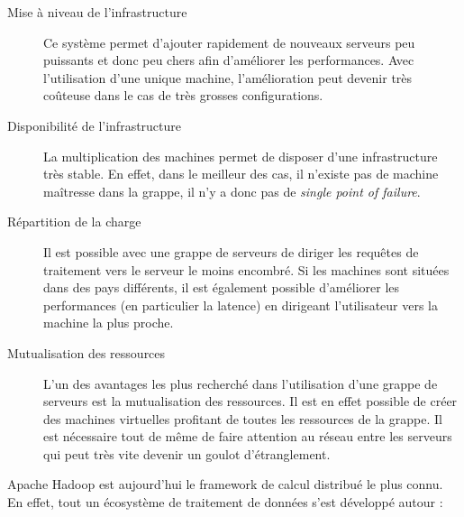     \begin{description}
      \item[Mise à niveau de l'infrastructure] Ce système permet d'ajouter rapidement de nouveaux serveurs peu puissants et donc peu chers afin d'améliorer les performances. Avec l'utilisation d'une unique machine, l'amélioration peut devenir très coûteuse dans le cas de très grosses configurations.
      \item[Disponibilité de l'infrastructure] La multiplication des machines permet de disposer d'une infrastructure très stable. En effet, dans le meilleur des cas, il n'existe pas de machine maîtresse dans la grappe, il n'y a donc pas de \textit{single point of failure}.
      \item[Répartition de la charge] Il est possible avec une grappe de serveurs de diriger les requêtes de traitement vers le serveur le moins encombré. Si les machines sont situées dans des pays différents, il est également possible d'améliorer les performances (en particulier la latence) en dirigeant l'utilisateur vers la machine la plus proche.
      \item[Mutualisation des ressources] L'un des avantages les plus recherché dans l'utilisation d'une grappe de serveurs est la mutualisation des ressources. Il est en effet possible de créer des machines virtuelles profitant de toutes les ressources de la grappe. Il est nécessaire tout de même de faire attention au réseau entre les serveurs qui peut très vite devenir un goulot d'étranglement.
    \end{description} \bigskip

    Apache Hadoop est aujourd'hui le framework de calcul distribué le plus connu. En effet, tout un écosystème de traitement de données s'est développé autour : \\

